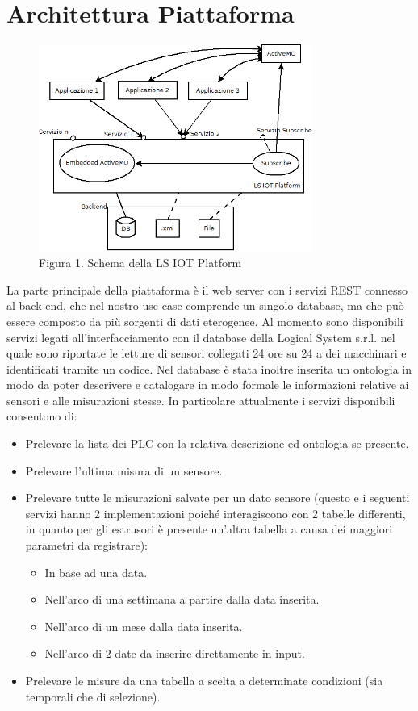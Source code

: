 \section{Architettura Piattaforma}
\begin{figure}[h]
	\centering
	\includegraphics[width=0.8\textwidth]{architettura-piattaforma.png}
	\caption*{Figura 1. Schema della LS IOT Platform}
\end{figure}
La parte principale della piattaforma è il web server con i servizi REST connesso al back end, che nel nostro use-case comprende un singolo database, ma che può essere composto da più sorgenti di dati eterogenee.
Al momento sono disponibili servizi legati all’interfacciamento con il database della Logical System s.r.l. nel quale sono riportate le letture di sensori collegati 24 ore su 24 a dei macchinari e identificati tramite un codice. Nel database è stata inoltre inserita un ontologia in modo da poter descrivere e catalogare in modo formale le informazioni relative ai sensori e alle misurazioni stesse.
In particolare attualmente i servizi disponibili consentono di:
\begin{itemize}
	\item Prelevare la lista dei PLC con la relativa descrizione ed ontologia se presente.
	\item Prelevare l’ultima misura di un sensore.
	\item Prelevare tutte le misurazioni salvate per un dato sensore (questo e i seguenti servizi hanno 2 implementazioni poiché interagiscono con 2 tabelle differenti, in quanto per gli estrusori è presente un’altra tabella a causa dei maggiori parametri da registrare): \begin{itemize}
		\item In base ad una data.
		\item Nell’arco di una settimana a partire dalla data inserita.
		\item Nell’arco di un mese dalla data inserita.
		\item Nell’arco di 2 date da inserire direttamente in input.	
	\end{itemize}
	\item Prelevare le misure da una tabella a scelta a determinate condizioni (sia temporali che di selezione).
\end{itemize}


